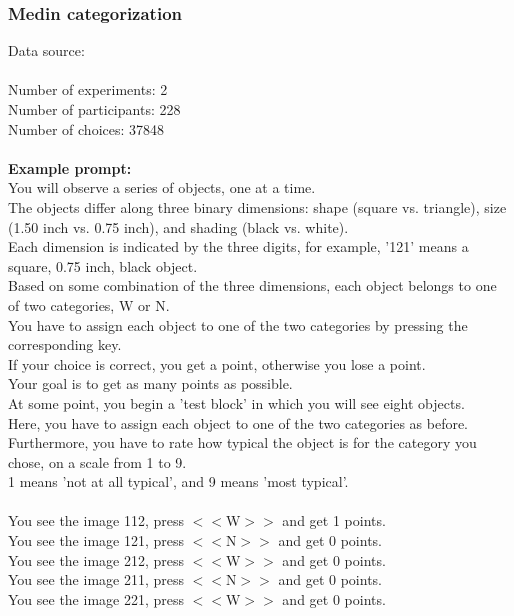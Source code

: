 \documentclass[pdflatex,sn-nature]{sn-jnl}%
\theoremstyle{thmstyleone}%
\theoremstyle{thmstyletwo}%
\theoremstyle{thmstylethree}%
\begin{document}
\subsubsection*{Medin categorization}
Data source: \cite{levering2020revisiting} \\ $~$ \\
Number of experiments: 2 $~$\\ 
Number of participants: 228 $~$\\ 
Number of choices: 37848 $~$\\ 
 $~$\\ 
\textbf{Example prompt:}
 $~$\\ 
You will observe a series of objects, one at a time. $~$\\ 
The objects differ along three binary dimensions: shape (square vs. triangle), size (1.50 inch vs. 0.75 inch), and shading (black vs. white). $~$\\ 
Each dimension is indicated by the three digits, for example, '121' means a square, 0.75 inch, black object. $~$\\ 
Based on some combination of the three dimensions, each object belongs to one of two categories, W or N. $~$\\ 
You have to assign each object to one of the two categories by pressing the corresponding key. $~$\\ 
If your choice is correct, you get a point, otherwise you lose a point. $~$\\ 
Your goal is to get as many points as possible. $~$\\ 
At some point, you begin a 'test block' in which you will see eight objects. $~$\\ 
Here, you have to assign each object to one of the two categories as before. $~$\\ 
Furthermore, you have to rate how typical the object is for the category you chose, on a scale from 1 to 9. $~$\\ 
1 means 'not at all typical', and 9 means 'most typical'. $~$\\ 
 $~$\\ 
You see the image 112, press $<<$W$>>$ and get 1 points. $~$\\ 
You see the image 121, press $<<$N$>>$ and get 0 points. $~$\\ 
You see the image 212, press $<<$W$>>$ and get 0 points. $~$\\ 
You see the image 211, press $<<$N$>>$ and get 0 points. $~$\\ 
You see the image 221, press $<<$W$>>$ and get 0 points. $~$\\ 
\end{document}
